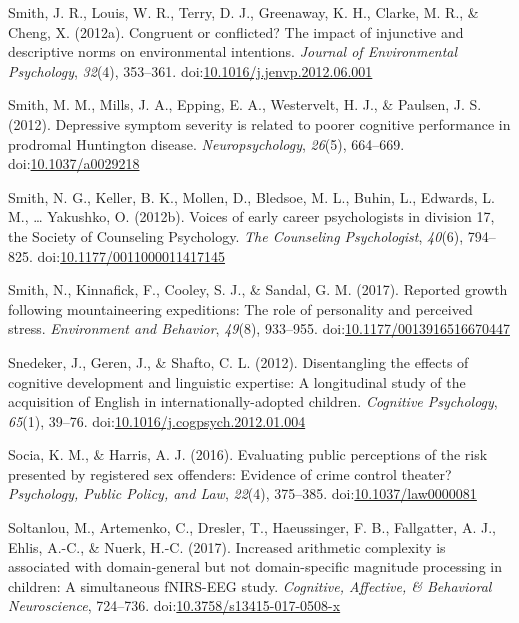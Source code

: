 \documentclass[english,man]{apa6}
\begin{document}
\hypertarget{ref-Smith2012b}{}
Smith, J. R., Louis, W. R., Terry, D. J., Greenaway, K. H., Clarke, M.
R., \& Cheng, X. (2012a). Congruent or conflicted? The impact of
injunctive and descriptive norms on environmental intentions.
\emph{Journal of Environmental Psychology}, \emph{32}(4), 353--361.
doi:\href{https://doi.org/10.1016/j.jenvp.2012.06.001}{10.1016/j.jenvp.2012.06.001}

\hypertarget{ref-Smith2012a}{}
Smith, M. M., Mills, J. A., Epping, E. A., Westervelt, H. J., \&
Paulsen, J. S. (2012). Depressive symptom severity is related to poorer
cognitive performance in prodromal Huntington disease.
\emph{Neuropsychology}, \emph{26}(5), 664--669.
doi:\href{https://doi.org/10.1037/a0029218}{10.1037/a0029218}

\hypertarget{ref-Smith2012}{}
Smith, N. G., Keller, B. K., Mollen, D., Bledsoe, M. L., Buhin, L.,
Edwards, L. M., \ldots{} Yakushko, O. (2012b). Voices of early career
psychologists in division 17, the Society of Counseling Psychology.
\emph{The Counseling Psychologist}, \emph{40}(6), 794--825.
doi:\href{https://doi.org/10.1177/0011000011417145}{10.1177/0011000011417145}

\hypertarget{ref-Smith2017}{}
Smith, N., Kinnafick, F., Cooley, S. J., \& Sandal, G. M. (2017).
Reported growth following mountaineering expeditions: The role of
personality and perceived stress. \emph{Environment and Behavior},
\emph{49}(8), 933--955.
doi:\href{https://doi.org/10.1177/0013916516670447}{10.1177/0013916516670447}

\hypertarget{ref-Snedeker2012}{}
Snedeker, J., Geren, J., \& Shafto, C. L. (2012). Disentangling the
effects of cognitive development and linguistic expertise: A
longitudinal study of the acquisition of English in
internationally-adopted children. \emph{Cognitive Psychology},
\emph{65}(1), 39--76.
doi:\href{https://doi.org/10.1016/j.cogpsych.2012.01.004}{10.1016/j.cogpsych.2012.01.004}

\hypertarget{ref-Socia2016}{}
Socia, K. M., \& Harris, A. J. (2016). Evaluating public perceptions of
the risk presented by registered sex offenders: Evidence of crime
control theater? \emph{Psychology, Public Policy, and Law},
\emph{22}(4), 375--385.
doi:\href{https://doi.org/10.1037/law0000081}{10.1037/law0000081}

\hypertarget{ref-Soltanlou2017}{}
Soltanlou, M., Artemenko, C., Dresler, T., Haeussinger, F. B.,
Fallgatter, A. J., Ehlis, A.-C., \& Nuerk, H.-C. (2017). Increased
arithmetic complexity is associated with domain-general but not
domain-specific magnitude processing in children: A simultaneous
fNIRS-EEG study. \emph{Cognitive, Affective, \& Behavioral
Neuroscience}, 724--736.
doi:\href{https://doi.org/10.3758/s13415-017-0508-x}{10.3758/s13415-017-0508-x}
\end{document}
